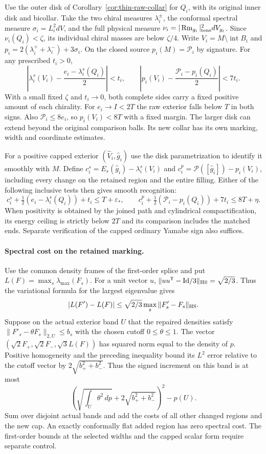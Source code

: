 Use the outer disk of Corollary~\ref{cor:thin-raw-collar} for \(Q_i\),
with its original inner disk and bicollar. Take the two chiral
measures \(\lambda_i^\pm\), the conformal spectral measure
\(\sigma_i=L_i^2dV\), and the full physical measure
\(\nu_i=|\operatorname{Rm}_{g_i}|_{\rm tens}^2dV_{g_i}\). Since \(\nu_i(Q_i)<\zeta\),
its individual chiral masses are below \(\zeta/4\).
Write \(V_i=M\setminus\operatorname{int} B_i\) and
\(p_i=2(\lambda_i^++\lambda_i^-)+3\sigma_i\).
On the closed source \(p_i(M)=\mathcal P_i\) by signature.
For any prescribed \(t_i>0\),
\[
 \left|\lambda_i^s(V_i)-\frac{e_i-\lambda_i^s(Q_i)}2\right|<t_i,
 \qquad
 \left|p_i(V_i)-\frac{\mathcal P_i-p_i(Q_i)}2\right|<7t_i .
\]
With a small fixed \(\zeta\) and \(t_i\to0\), both complete sides
carry a fixed positive amount of each chirality. For \(e_i\to I<2T\)
the raw exterior falls below \(T\) in both signs. Also
\(\mathcal P_i\le8e_i\), so \(p_i(V_i)<8T\) with a fixed margin.
The larger disk can extend beyond the original comparison balls.
Its new collar has its own marking, width and coordinate estimates.

For a positive capped exterior \((\widehat V_i,\widehat g_i)\) use
the disk parametrization to identify it smoothly with \(M\). Define
\(c_i^s=E_s(\widehat g_i)-\lambda_i^s(V_i)\) and
\(c_i^p=\mathcal P([\widehat g_i])-p_i(V_i)\), including every
change on the retained region and the entire filling. Either of
the following inclusive tests then gives smooth recognition:
\[
 c_i^s+\tfrac12(e_i-\lambda_i^s(Q_i))+t_i\le T+\varepsilon_*,
 \qquad
 c_i^p+\tfrac12(\mathcal P_i-p_i(Q_i))+7t_i\le8T+\eta .
\]
When positivity is obtained by the joined path and cylindrical
compactification, its energy ceiling is strictly below \(2T\)
and its comparison includes the matched ends. Separate verification
of the capped ordinary Yamabe sign also suffices.

\paragraph{Spectral cost on the retained marking.}
Use the common density frames of the first-order splice and put
\(L(F)=\max_s\lambda_{\max}(F_s)\). For a unit vector \(u\),
\(\|uu^{\mathsf T}-\mathrm{Id}/3\|_{\rm HS}=\sqrt{2/3}\).
Thus the variational formula for the largest eigenvalue gives
\[
 |L(F')-L(F)|\le\sqrt{2/3}\max_s\|F'_s-F_s\|_{\rm HS}.
\]
Suppose on the actual exterior band \(U\) that the repaired
densities satisfy \(\|F'_s-\theta F_s\|_{2,U}\le b_s\) with
the chosen cutoff \(0\le\theta\le1\). The vector
\((\sqrt2 F_+,\sqrt2 F_-,\sqrt3 L(F))\) has squared norm equal
to the density of \(p\). Positive homogeneity and the preceding
inequality bound its \(L^2\) error relative to the cutoff vector by
\(2\sqrt{b_+^2+b_-^2}\). Thus the signed increment on this band
is at most
\[
 \left(\sqrt{\int_U\theta^2\,dp}
             +2\sqrt{b_+^2+b_-^2}\right)^2-p(U).
\]
Sum over disjoint actual bands and add the costs of all other
changed regions and the new cap. An exactly conformally flat added
region has zero spectral cost. The first-order bounds at the
selected widths and the capped scalar form require separate control.

